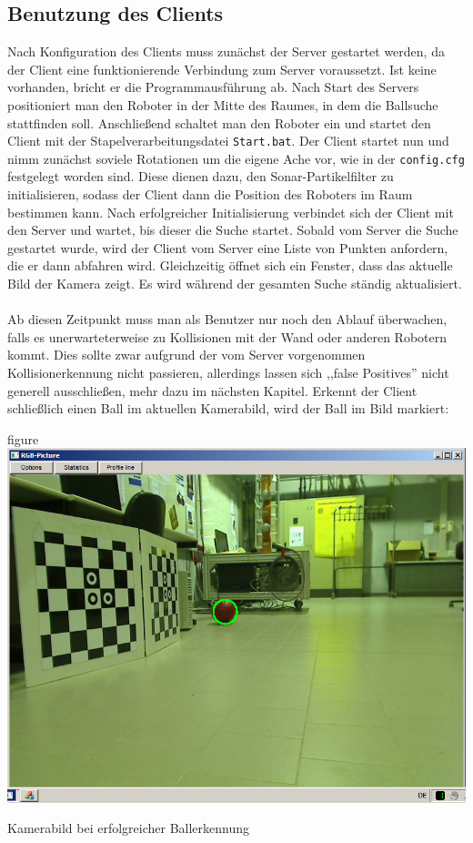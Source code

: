 
\subsection{Benutzung des Clients}
\label{sec:benutz-des-clients}
Nach Konfiguration des Clients muss zunächst der Server gestartet
werden, da der Client eine funktionierende Verbindung zum Server
voraussetzt. Ist keine vorhanden, bricht er die Programmausführung ab.
Nach Start des Servers  positioniert man den Roboter in der Mitte des
Raumes, in dem die Ballsuche stattfinden soll. Anschließend schaltet
man den Roboter ein und startet den Client mit der
Stapelverarbeitungsdatei \verb|Start.bat|. Der Client startet nun und
nimm zunächst soviele Rotationen um die eigene Ache vor, wie in der
\verb|config.cfg| festgelegt worden sind. Diese dienen dazu, den
Sonar-Partikelfilter zu initialisieren, sodass der Client dann die
Position des Roboters im Raum bestimmen kann. Nach erfolgreicher
Initialisierung verbindet sich der Client mit den Server und wartet,
bis dieser die Suche startet. Sobald vom Server die Suche gestartet
wurde, wird der Client vom Server eine Liste von Punkten anfordern,
die er dann abfahren wird. Gleichzeitig öffnet sich ein Fenster, dass
das aktuelle Bild der Kamera zeigt. Es wird während der gesamten Suche
ständig aktualisiert. \\\\
Ab diesen Zeitpunkt muss man als Benutzer
nur noch den Ablauf überwachen, falls es unerwarteterweise zu
Kollisionen mit der Wand oder anderen Robotern kommt. Dies sollte zwar
aufgrund der vom Server vorgenommen Kollisionerkennung nicht
passieren, allerdings lassen sich ,,false Positives'' nicht generell
ausschließen, mehr dazu im nächsten Kapitel. Erkennt der Client
schließlich einen Ball im aktuellen Kamerabild, wird der Ball im Bild
markiert:
\begin{nofloat}{figure}\centering
\includegraphics[width=0.75\linewidth]{bilder/balldetect}
\caption{Kamerabild bei erfolgreicher Ballerkennung}  
\end{nofloat}


